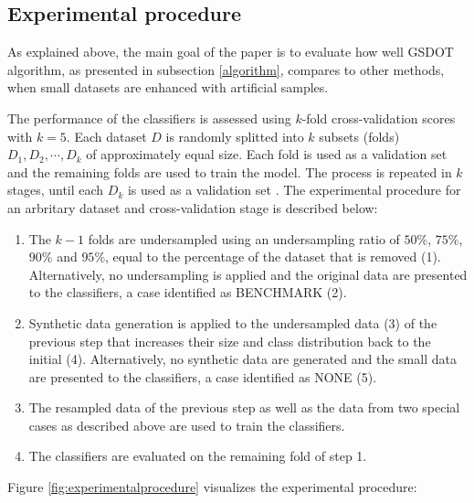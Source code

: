 \subsection{Experimental procedure}
\label{experimental}

As explained above, the main goal of the paper is to evaluate how well GSDOT algorithm, as presented in subsection \ref{algorithm}, compares to other methods, when small datasets are enhanced with artificial samples. 

The performance of the classifiers is assessed using \(k \)-fold cross-validation scores with \( k = 5 \). Each dataset \( D \) is randomly splitted into \( k \) subsets (folds) \( D_1, D_2, \cdots, D_k \) of approximately equal size. Each fold is used as a validation set and the remaining folds are used to train the model. The process is repeated in \( k \) stages, until each \( D_k \) is used as a validation set \cite{Han.2012}. The experimental procedure for an arbritary dataset and cross-validation stage is described below:

\begin{enumerate}

	\item The \( k - 1 \) folds are undersampled using an undersampling ratio
	of $50\%$, $75\%$, $90\%$ and $95\%$, equal to the percentage of the dataset that is removed (1). Alternatively, no undersampling is applied and the original data are presented to the classifiers, a case identified as BENCHMARK (2).

	\item Synthetic data generation is applied to the undersampled data (3) of the previous
	step that increases their size and class distribution back to the initial (4). Alternatively, no synthetic data are generated and the small data are presented to the classifiers, a case identified as NONE (5).

	\item The resampled data of the previous step as well as the data from two special cases as described above are used to train the classifiers.
	
	\item The classifiers are evaluated on the remaining fold of step 1.

\end{enumerate}

 Figure \ref{fig:experimentalprocedure} visualizes the experimental procedure: 

